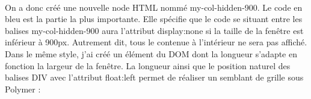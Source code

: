 \documentclass{article}
\begin{document}
\vspace{0.5cm}\\
On a donc cr\'e\'e une nouvelle node HTML nomm\'e my-col-hidden-900. Le code en bleu est la partie la plus importante. Elle sp\'ecifie que le code se situant entre les balises \og my-col-hidden-900 \fg{} aura l'attribut \og display:none \fg{} si la taille de la fen\^etre est inf\'erieur \`a 900px. Autrement dit, tous le contenue \`a l'int\'erieur ne sera pas affich\'e.\\
Dans le m\^eme style, j'ai cr\'e\'e un \'el\'ement du DOM dont la longueur s'adapte en fonction la largeur de la fen\^etre. La longueur ainsi que le position naturel des balises DIV avec l'attribut \og float:left \fg{} permet de r\'ealiser un semblant de grille sous Polymer :
\vspace{0.5cm}\\
\\
\end{document}
